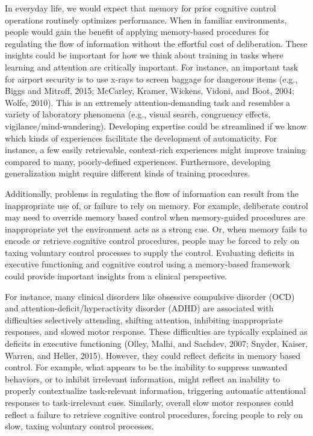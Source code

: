 \documentclass[]{DissertateCUNY}
\begin{document}
In everyday life, we would expect that memory for prior cognitive
control operations routinely optimizes performance. When in familiar
environments, people would gain the benefit of applying memory-based
procedures for regulating the flow of information without the effortful
cost of deliberation. These insights could be important for how we think
about training in tasks where learning and attention are critically
important. For instance, an important task for airport security is to
use x-rays to screen baggage for dangerous items (e.g., Biggs and
Mitroff, 2015; McCarley, Kramer, Wickens, Vidoni, and Boot, 2004; Wolfe,
2010). This is an extremely attention-demanding task and resembles a
variety of laboratory phenomena (e.g., visual search, congruency
effects, vigilance/mind-wandering). Developing expertise could be
streamlined if we know which kinds of experiences facilitate the
development of automaticity. For instance, a few easily retrievable,
context-rich experiences might improve training compared to many,
poorly-defined experiences. Furthermore, developing generalization might
require different kinds of training procedures.

Additionally, problems in regulating the flow of information can result
from the inappropriate use of, or failure to rely on memory. For
example, deliberate control may need to override memory based control
when memory-guided procedures are inappropriate yet the environment acts
as a strong cue. Or, when memory fails to encode or retrieve cognitive
control procedures, people may be forced to rely on taxing voluntary
control processes to supply the control. Evaluating deficits in
executive functioning and cognitive control using a memory-based
framework could provide important insights from a clinical perspective.

For instance, many clinical disorders like obsessive compulsive disorder
(OCD) and attention-deficit/hyperactivity disorder (ADHD) are associated
with difficulties selectively attending, shifting attention, inhibiting
inappropriate responses, and slowed motor response. These difficulties
are typically explained as deficits in executive functioning (Olley,
Malhi, and Sachdev, 2007; Snyder, Kaiser, Warren, and Heller, 2015).
However, they could reflect deficits in memory based control. For
example, what appears to be the inability to suppress unwanted
behaviors, or to inhibit irrelevant information, might reflect an
inability to properly contextualize task-relevant information,
triggering automatic attentional responses to task-irrelevant cues.
Similarly, overall slow motor responses could reflect a failure to
retrieve cognitive control procedures, forcing people to rely on slow,
taxing voluntary control processes.
\end{document}
